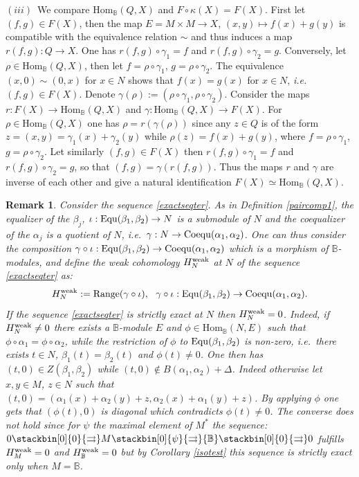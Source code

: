 \documentclass[12pt]{article}
\newtheorem{rem}[thm]{Remark}
\def\Hom{{\rm Hom}}
\def\equ{{\rm Equ}}
\def\coequ{{\rm Coequ}}
\def\Range{{\rm Range}}
\def\B{{\mathbb B}}
\def\hweak{H^{\rm weak}}
\def\strgly{strictly }
\newcommand{\ie}{{\it i.e.\/}\ }
\def\Hom {{\mbox{Hom}}}
\begin{document}
$(iii)$~We  compare $\Hom_\B(Q,X)$ and $F\circ \kappa(X)=F(X)$. First let $(f,g)\in F(X)$, then the map $E=M\times M\to X$, $(x,y)\mapsto f(x)+g(y)$ is compatible with the equivalence relation $\sim$ and thus induces a map $r(f,g):Q\to X$. One has $r(f,g)\circ \gamma_1=f$ and $r(f,g)\circ \gamma_2=g$. Conversely, let $\rho\in \Hom_\B(Q,X)$, then let $f=\rho\circ \gamma_1$, $g=\rho\circ \gamma_2$. The equivalence $(x,0)\sim (0,x)$ for $x\in N$ shows that $f(x)=g(x)$ for $x\in N$, \ie $(f,g)\in F(X)$. Denote $\gamma(\rho):=(\rho\circ \gamma_1,\rho\circ \gamma_2)$. Consider the maps $r:F(X)\to \Hom_\B(Q,X)$ and $\gamma:\Hom_\B(Q,X)\to F(X)$. For $\rho\in \Hom_\B(Q,X)$ one has $\rho=r(\gamma(\rho))$ since any $z\in Q$ is of the form $z=(x,y)=\gamma_1(x)+\gamma_2(y)$ while $\rho(z)=f(x)+g(y)$, where $f=\rho\circ \gamma_1$, $g=\rho\circ \gamma_2$. Let similarly $(f,g)\in F(X)$
then $r(f,g)\circ \gamma_1=f$ and $r(f,g)\circ \gamma_2=g$, so that $(f,g)=\gamma(r(f,g))$. Thus the maps $r$ and $\gamma$ are inverse of each other and give a natural identification 
$F(X)\simeq \Hom_\B(Q,X)$.
\endproof 




 
\begin{rem} Consider the sequence \eqref{exactseqter}. As in Definition \ref{paircomp1},  the equalizer of the $\beta_j$, 
 $\iota:\equ(\beta_1,\beta_2)\to N$  is a submodule of $N$
 and the 	coequalizer of the $\alpha_j$  is a quotient of $N$, \ie $\gamma:N \to \coequ(\alpha_1,\alpha_2)$. One can thus consider the composition $\gamma\circ \iota:\equ(\beta_1,\beta_2)\to \coequ(\alpha_1,\alpha_2)$ which is a morphism of $\B$-modules, and  define the {\em  weak cohomology} $\hweak_N$ at $N$ of the sequence \eqref{exactseqter} as:
\begin{equation}	
\label{defnweakcohom}
\hweak_N:=\Range(\gamma\circ \iota) , \ \ \gamma\circ \iota:\equ(\beta_1,\beta_2)\to \coequ(\alpha_1,\alpha_2).
\end{equation}
If the sequence \eqref{exactseqter} is  \strgly exact at $N$ then $\hweak_N=0$. 
Indeed, if $\hweak_N\neq 0$
	 there exists a $\B$-module $E$ and $\phi\in \Hom_\B(N,E)$ such that $\phi\circ \alpha_1=\phi\circ \alpha_2$, while 
	the restriction of $\phi$ to $\equ (\beta_1,\beta_2)$ is non-zero, \ie there exists $t\in N$, $\beta_1(t)=\beta_2(t)$ and $\phi(t)\neq 0$. One then has $(t,0)\in Z(\beta_1,\beta_2)$ while $(t,0)\notin B(\alpha_1,\alpha_2)+\Delta$. Indeed otherwise let $x,y\in M$, $z\in N$ such that
	$
	(t,0)=(\alpha_1(x)+\alpha_2(y)+z,\alpha_2(x)+\alpha_1(y)+z)
	$. 
	By applying $\phi$ one gets that $(\phi(t),0)$ is diagonal which contradicts $\phi(t)\neq 0$. \newline
The converse does not hold since for $\psi$ the maximal element of $M^*$ the sequence:
$
0 \stackbin[0]{0}{\rightrightarrows}M\stackbin[0]{\psi}{\rightrightarrows}\B\stackbin[0]{0}{\rightrightarrows}0
$
fulfills $\hweak_M=0$ and $\hweak_\B=0$ but 
 by Corollary \ref{isotest}  this sequence is  \strgly exact  only when  $M=\B$.
 \end{rem}
\end{document}
